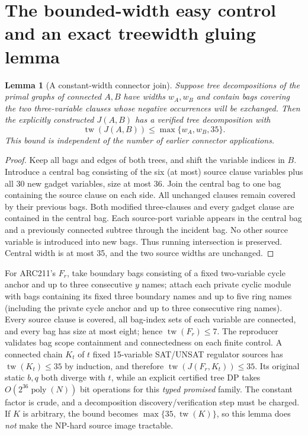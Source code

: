 \documentclass[10pt]{article}
\newtheorem{lemma}[theorem]{Lemma}
\begin{document}
\section{The bounded-width easy control and an exact treewidth gluing lemma}
\begin{lemma}[A constant-width connector join]
Suppose tree decompositions of the primal graphs of connected $A,B$ have widths $w_A,w_B$ and contain bags covering the two three-variable clauses whose negative occurrences will be exchanged. Then the explicitly constructed $J(A,B)$ has a verified tree decomposition with
\[\operatorname{tw}(J(A,B))\le\max\{w_A,w_B,35\}.\]
This bound is independent of the number of earlier connector applications.
\end{lemma}
\begin{proof}
Keep all bags and edges of both trees, and shift the variable indices in $B$. Introduce a central bag consisting of the six (at most) source clause variables plus all 30 new gadget variables, size at most 36. Join the central bag to one bag containing the source clause on each side. All unchanged clauses remain covered by their previous bags. Both modified three-clauses and every gadget clause are contained in the central bag. Each source-port variable appears in the central bag and a previously connected subtree through the incident bag. No other source variable is introduced into new bags. Thus running intersection is preserved. Central width is at most 35, and the two source widths are unchanged.
\end{proof}
\noindent For ARC211's $F_r$, take boundary bags consisting of a fixed two-variable cycle anchor and up to three consecutive $y$ names; attach each private cyclic module with bags containing its fixed three boundary names and up to five ring names (including the private cycle anchor and up to three consecutive ring names). Every source clause is covered, all bag-index sets of each variable are connected, and every bag has size at most eight; hence $\operatorname{tw}(F_r)\le7$. The reproducer validates bag scope containment and connectedness on each finite control. A connected chain $K_t$ of $t$ fixed 15-variable SAT/UNSAT regulator sources has $\operatorname{tw}(K_t)\le35$ by induction, and therefore $\operatorname{tw}(J(F_r,K_t))\le35$. Its original static $b,q$ both diverge with $t$, while an explicit certified tree DP takes $O(2^{36}\operatorname{poly}(N))$ bit operations for this \emph{typed promised} family. The constant factor is crude, and a decomposition discovery/verification step must be charged. If $K$ is arbitrary, the bound becomes $\max\{35,\operatorname{tw}(K)\}$, so this lemma does \emph{not} make the NP-hard source image tractable.
\end{document}
